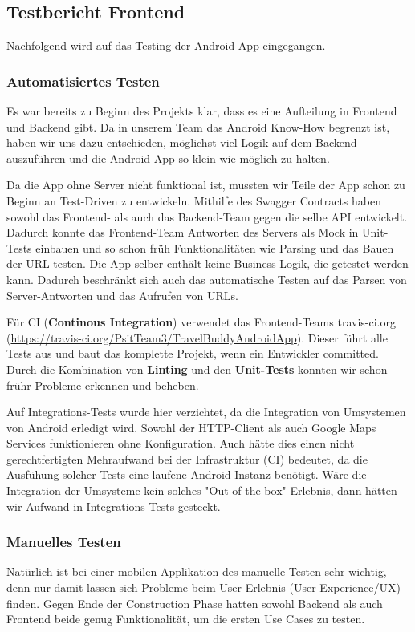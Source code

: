 \subsection{Testbericht Frontend}\label{testbericht_frontend}
Nachfolgend wird auf das Testing der Android App eingegangen.

\subsubsection{Automatisiertes Testen}\label{automatisiertes_test_frontend}
Es war bereits zu Beginn des Projekts klar, dass es eine Aufteilung in Frontend und Backend
gibt. Da in unserem Team das Android Know-How begrenzt ist, haben wir uns dazu entschieden,
möglichst viel Logik auf dem Backend auszuführen und die Android App so klein wie möglich zu halten.

Da die App ohne Server nicht funktional ist, mussten wir Teile der App schon zu Beginn an
Test-Driven zu entwickeln. Mithilfe des Swagger Contracts haben sowohl das Frontend- als auch das
Backend-Team gegen die selbe API entwickelt. Dadurch konnte das Frontend-Team Antworten des Servers
als Mock in Unit-Tests einbauen und so schon früh Funktionalitäten wie Parsing und das Bauen der URL
testen. Die App selber enthält keine Business-Logik, die getestet werden kann. Dadurch beschränkt sich
auch das automatische Testen auf das Parsen von Server-Antworten und das Aufrufen von URLs.

Für CI (\textbf{Continous Integration}) verwendet das Frontend-Teams travis-ci.org 
(\url{https://travis-ci.org/PsitTeam3/TravelBuddyAndroidApp}). Dieser führt alle Tests
aus und baut das komplette Projekt, wenn ein Entwickler committed. Durch die Kombination von \textbf{Linting}
und den \textbf{Unit-Tests} konnten wir schon frühr Probleme erkennen und beheben.

Auf Integrations-Tests wurde hier verzichtet, da die Integration von Umsystemen von Android erledigt
wird. Sowohl der HTTP-Client als auch Google Maps Services funktionieren ohne Konfiguration. Auch hätte
dies einen nicht gerechtfertigten Mehraufwand bei der Infrastruktur (CI) bedeutet, da die Ausfühung
solcher Tests eine laufene Android-Instanz benötigt. Wäre die Integration der Umsysteme kein solches
"Out-of-the-box"-Erlebnis, dann hätten wir Aufwand in Integrations-Tests gesteckt.

\subsubsection{Manuelles Testen}\label{manuelles_testen_frontend}
Natürlich ist bei einer mobilen Applikation des manuelle Testen sehr wichtig, denn nur damit lassen
sich Probleme beim User-Erlebnis (User Experience/UX) finden. Gegen Ende der Construction Phase
hatten sowohl Backend als auch Frontend beide genug Funktionalität, um die ersten Use Cases zu testen.

